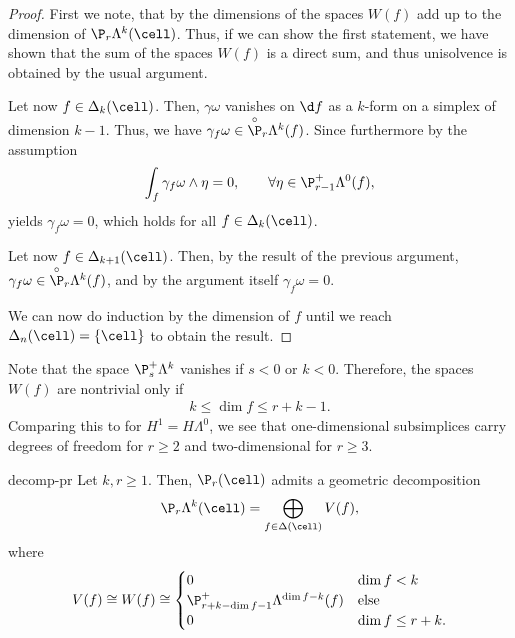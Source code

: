 \begin{proof}
  First we note, that by
   the dimensions
  of the spaces $W(f)$ add up to the dimension of
  $\P_r\Lambda^k(\cell)$. Thus, if we can show the first statement, we
  have shown that the sum of the spaces $W(f)$ is a direct sum, and
  thus unisolvence is obtained by the usual argument.

  Let now $f\in\Delta_k(\cell)$. Then, $\gamma\omega$ vanishes on
  $\d f$ as a $k$-form on a simplex of dimension $k-1$. Thus, we have
  $\gamma_f\omega\in \overset{\circ}{\P}_r\Lambda^k(f)$. Since
  furthermore by the assumption
  \begin{gather}
    \int_f \gamma_f\omega\wedge \eta = 0,
    \qquad \forall \eta \in \P_{r-1}^+\Lambda^0(f),
  \end{gather}
   yields $\gamma_f\omega = 0$, which holds
  for all $f\in\Delta_k(\cell)$.

  Let now $f\in \Delta_{k+1}(\cell)$. Then, by the result of the
  previous argument,
  $\gamma_f\omega\in \overset{\circ}{\P}_r\Lambda^k(f)$, and by the
  argument itself $\gamma_f \omega = 0$.

  We can now do induction by the dimension of $f$ until we reach
  $\Delta_n(\cell) = \{\cell\}$ to obtain the result.
\end{proof}

\begin{remark}
  Note that the space $\P_s^+\Lambda^k$ vanishes if $s<0$ or
  $k<0$. Therefore, the spaces $W(f)$ are nontrivial only if
  \begin{gather}
    k \le \dim f \le r+k-1.
  \end{gather}
  Comparing this to  for
  $H^1 = H\Lambda^0$, we see that one-dimensional subsimplices carry
  degrees of freedom for $r\ge 2$ and two-dimensional for $r\ge 3$.
\end{remark}

\begin{Theorem}{decomp-pr}
  Let $k,r\ge 1$. Then, $\P_r(\cell)$ admits a geometric decomposition
  \begin{gather}
    \P_r\Lambda^k(\cell) = \bigoplus_{f\in\Delta(\cell)} V(f),
  \end{gather}
  where
  \begin{gather}
    V(f) \cong W(f) \cong
    \begin{cases}
      0 & \dim f < k\\
      \P_{r+k-\dim f-1}^+ \Lambda^{\dim f-k}(f) &\text{else}\\
      0 & \dim f \le r+k.
    \end{cases}
  \end{gather}
\end{Theorem}

